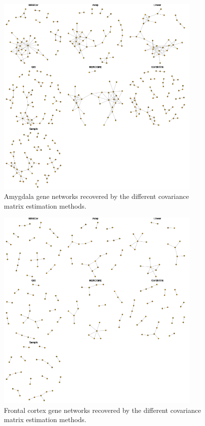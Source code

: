 \documentclass[useAMS,referee,usenatbib]{biom}
\begin{document}
\begin{figure}
  \begin{center}
    \includegraphics[width=0.9\textwidth]{img/networks_A.png}
  \end{center}
\caption{Amygdala gene networks recovered by the different covariance matrix estimation methods.}
\label{network_A}
\end{figure}

\begin{figure}
  \begin{center}
    \includegraphics[width=0.9\textwidth]{img/networks_FC.png}
  \end{center}
\caption{Frontal cortex gene networks recovered by the different covariance matrix estimation methods.}
\label{network_FC}
\end{figure}
\end{document}
